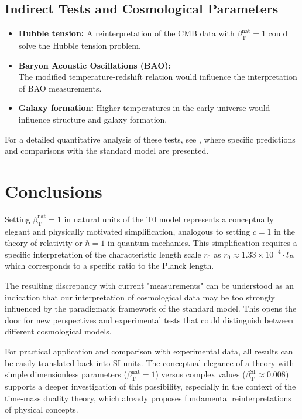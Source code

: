 \documentclass[12pt,a4paper]{article}
\newcommand{\betaT}{\beta_{\text{T}}}
\begin{document}
	\subsection{Indirect Tests and Cosmological Parameters}
	
	\begin{itemize}
		\item \textbf{Hubble tension:} A reinterpretation of the CMB data with \(\betaT^{\text{nat}} = 1\) could solve the Hubble tension problem.
		\item \textbf{Baryon Acoustic Oscillations (BAO):} \\The modified temperature-redshift relation would influence the interpretation of BAO measurements.
		\item \textbf{Galaxy formation:} Higher temperatures in the early universe would influence structure and galaxy formation.
	\end{itemize}
	
	For a detailed quantitative analysis of these tests, see \cite{pascher_alphabeta_2025}, where specific predictions and comparisons with the standard model are presented.
	
	\section{Conclusions}
	
	Setting \(\betaT^{\text{nat}} = 1\) in natural units of the T0 model represents a conceptually elegant and physically motivated simplification, analogous to setting \(c = 1\) in the theory of relativity or \(\hbar = 1\) in quantum mechanics. This simplification requires a specific interpretation of the characteristic length scale \(r_0\) as \(r_0 \approx 1.33 \times 10^{-4} \cdot l_P\), which corresponds to a specific ratio to the Planck length.
	
	The resulting discrepancy with current "measurements" can be understood as an indication that our interpretation of cosmological data may be too strongly influenced by the paradigmatic framework of the standard model. This opens the door for new perspectives and experimental tests that could distinguish between different cosmological models.
	
	For practical application and comparison with experimental data, all results can be easily translated back into SI units. The conceptual elegance of a theory with simple dimensionless parameters (\(\betaT^{\text{nat}} = 1\)) versus complex values (\(\betaT^{\text{SI}} \approx 0.008\)) supports a deeper investigation of this possibility, especially in the context of the time-mass duality theory, which already proposes fundamental reinterpretations of physical concepts.
	
\end{document}
